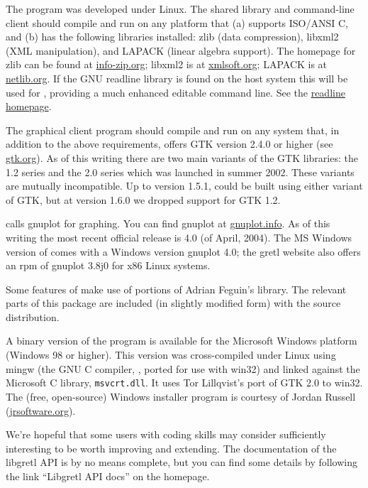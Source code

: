 The program was developed under Linux. The shared library and
command-line client should compile and run on any platform that (a)
supports ISO/ANSI C, and (b) has the following libraries installed:
zlib (data compression), libxml2 (XML manipulation), and LAPACK
(linear algebra support). The homepage for zlib can be found at
\href{http://www.info-zip.org/pub/infozip/zlib/}{info-zip.org};
libxml2 is at \href{http://xmlsoft.org/}{xmlsoft.org}; LAPACK is at
\href{http://www.netlib.org/lapack/}{netlib.org}. If the GNU readline
library is found on the host system this will be used for
, providing a much enhanced editable command line.  See
the
\href{http://cnswww.cns.cwru.edu/~chet/readline/rltop.html}{readline
  homepage}.

The graphical client program should compile and run on any system
that, in addition to the above requirements, offers GTK version 2.4.0
or higher (see \href{http://www.gtk.org/}{gtk.org}).  As of this
writing there are two main variants of the GTK libraries: the 1.2
series and the 2.0 series which was launched in summer 2002.  These
variants are mutually incompatible.  Up to version 1.5.1, 
could be built using either variant of GTK, but at version 1.6.0 we
dropped support for GTK 1.2.
  
 calls gnuplot for graphing. You can find gnuplot at
\href{http://www.gnuplot.info/}{gnuplot.info}.  As of this writing the
most recent official release is 4.0 (of April, 2004).  The MS Windows
version of  comes with a Windows version gnuplot 4.0; the
gretl website also offers an rpm of gnuplot 3.8j0 for x86 Linux
systems.
  
Some features of  make use of portions of Adrian Feguin's
 library.  The relevant parts of this package are
included (in slightly modified form) with the  source
distribution.
  
A binary version of the program is available for the Microsoft Windows
platform (Windows 98 or higher). This version was cross-compiled under
Linux using mingw (the GNU C compiler, , ported for use with
win32) and linked against the Microsoft C library, \verb+msvcrt.dll+.
It uses Tor Lillqvist's port of GTK 2.0 to win32.  The (free,
open-source) Windows installer program is courtesy of Jordan Russell
(\href{http://www.jrsoftware.org/}{jrsoftware.org}).

We're hopeful that some users with coding skills may consider
 sufficiently interesting to be worth improving and
extending.  The documentation of the libgretl API is by no means
complete, but you can find some details by following the link
``Libgretl API docs'' on the  homepage.

